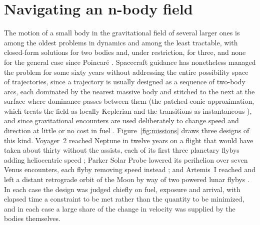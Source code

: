 \documentclass[11pt]{article}
\begin{document}
\section{Navigating an n-body field}
\label{sec:field}

The motion of a small body in the gravitational field of several larger ones
is among the oldest problems in dynamics and among the least tractable,
with closed-form solutions for two bodies and, under restriction, for
three, and none for the general case since Poincar\'e
\cite{poincare1890,szebehely1967,henon1964}. Spacecraft
guidance has nonetheless managed the problem for some sixty years without
addressing the entire possibility space of trajectories, since a trajectory
is usually designed as a sequence of two-body arcs, each dominated by the
nearest massive body and stitched to the next at the surface where dominance
passes between them (the patched-conic approximation, which treats the field
as locally Keplerian and the transitions as instantaneous
\cite{bate1971,battin1999,hill1878}), and since gravitational encounters are
used deliberately to change speed and direction at little or no cost in fuel
\cite{flandro1966}. Figure~\ref{fig:missions} draws three designs of this
kind. Voyager~2 reached Neptune in twelve years on a flight that would have
taken about thirty without the assists, each of its first three planetary
flybys adding heliocentric speed \cite{kohlhase1977,nasa_voyager_voyage};
Parker Solar Probe lowered its perihelion over seven Venus encounters, each
flyby removing speed instead \cite{fox2016,guo2010}; and Artemis~I reached
and left a distant retrograde orbit of the Moon by way of two powered lunar
flybys \cite{batcha2020}. In each case the design was judged chiefly on
fuel, exposure and arrival, with elapsed time a constraint to be met rather
than the quantity to be minimized, and in each case a large share of the
change in velocity was supplied by the bodies themselves.
\end{document}
